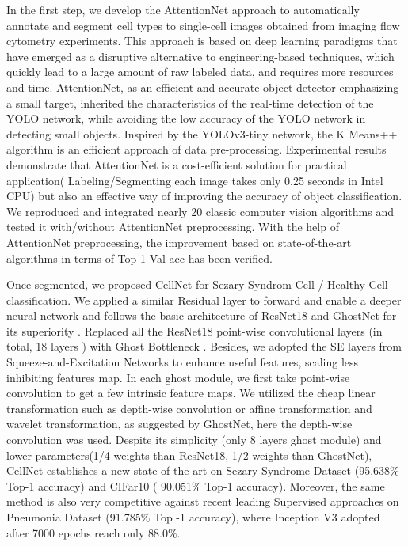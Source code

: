 In the first step, we develop the AttentionNet approach to automatically annotate and segment cell types to single-cell images obtained from imaging flow cytometry experiments. This approach is based on deep learning paradigms that have emerged as a disruptive alternative to engineering-based techniques, which quickly lead to a large amount of raw labeled data, and requires more resources and time. AttentionNet, as an efficient and accurate object detector emphasizing a small target, inherited the characteristics of the real-time detection of the YOLO network\cite{yolov1}, while avoiding the low accuracy of the YOLO network in detecting small objects. Inspired by the YOLOv3-tiny network\cite{33}, the K Means++ algorithm is an efficient approach of data pre-processing\cite{18}. Experimental results demonstrate that AttentionNet is a cost-efficient solution for practical application( Labeling/Segmenting each image takes only 0.25 seconds in Intel CPU) but also an effective way of improving the accuracy of object classification. We reproduced and integrated nearly 20 classic computer vision algorithms and tested it with/without AttentionNet preprocessing. With the help of AttentionNet preprocessing, the improvement based on state-of-the-art algorithms in terms of Top-1 Val-acc has been verified.

Once segmented, we proposed CellNet for Sezary Syndrom Cell / Healthy Cell classification. We applied a similar Residual layer to forward and enable a deeper neural network and follows the basic architecture of ResNet18 and GhostNet for its superiority \cite{19}\cite{20}. Replaced all the ResNet18 \cite{20} point-wise convolutional layers (in total, 18 layers ) with Ghost Bottleneck \cite{19}. Besides, we adopted the SE layers from Squeeze-and-Excitation Networks \cite{24} to enhance useful features, scaling less inhibiting features map. In each ghost module, we first take point-wise convolution to get a few intrinsic feature maps. We utilized the cheap linear transformation such as depth-wise convolution or affine transformation and wavelet transformation, as suggested by GhostNet\cite{19}, here the depth-wise convolution was used.
Despite its simplicity (only 8 layers ghost module) and lower parameters(1/4 weights than ResNet18\cite{20}, 1/2 weights than GhostNet\cite{19}), CellNet establishes a new state-of-the-art on Sezary Syndrome Dataset (95.638\% Top-1 accuracy) and CIFar10 ( 90.051\% Top-1 accuracy)\cite{21}. Moreover, the same method is also very competitive against recent leading Supervised approaches on Pneumonia Dataset (91.785\% Top -1 accuracy), where Inception V3 adopted after 7000 epochs reach only 88.0\%\cite{38}.

